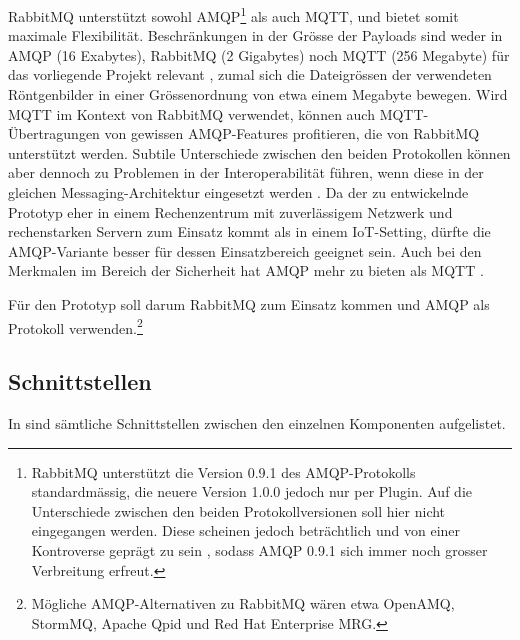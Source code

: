 RabbitMQ unterstützt sowohl AMQP\footnote{RabbitMQ unterstützt die Version 0.9.1 des AMQP-Protokolls standardmässig, die neuere Version 1.0.0 jedoch nur per Plugin. Auf die Unterschiede zwischen den beiden Protokollversionen soll hier nicht eingegangen werden. Diese scheinen jedoch beträchtlich und von einer Kontroverse geprägt zu sein \cite{hintjens-amqp}, sodass AMQP 0.9.1 sich immer noch grosser Verbreitung erfreut.} als auch MQTT, und bietet somit maximale Flexibilität.  Beschränkungen in der Grösse der Payloads sind weder in AMQP (16 Exabytes), RabbitMQ (2 Gigabytes) noch MQTT (256 Megabyte) für das vorliegende Projekt relevant \cite[S. 180]{rabbitmq}, zumal sich die Dateigrössen der verwendeten Röntgenbilder in einer Grössenordnung von etwa einem Megabyte bewegen. Wird MQTT im Kontext von RabbitMQ verwendet, können auch MQTT-Übertragungen von gewissen AMQP-Fea\-tures profitieren, die von RabbitMQ unterstützt werden. Subtile Unterschiede zwischen den beiden Protokollen können aber dennoch zu Problemen in der Interoperabilität führen, wenn diese in der gleichen Messaging-Architektur eingesetzt werden \cite[S. 179]{rabbitmq}. Da der zu entwickelnde Prototyp eher in einem Rechenzentrum mit zuverlässigem Netzwerk und rechenstarken Servern zum Einsatz kommt als in einem IoT-Setting, dürfte die AMQP-Variante besser für dessen Einsatzbereich geeignet sein. Auch bei den Merkmalen im Bereich der Sicherheit hat AMQP mehr zu bieten als MQTT \cite{amqp-vs-mqtt}.

Für den Prototyp soll darum RabbitMQ zum Einsatz kommen und AMQP als Protokoll verwenden.\footnote{Mögliche AMQP-Alternativen zu RabbitMQ wären etwa OpenAMQ, StormMQ, Apache Qpid und Red Hat Enterprise MRG.}

\subsection{Schnittstellen}

In  sind sämtliche Schnittstellen zwischen den einzelnen Komponenten aufgelistet.

